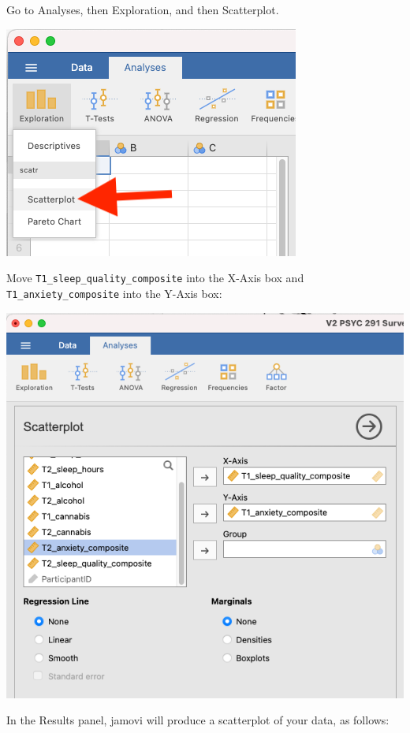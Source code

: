 \documentclass[
]{book}
\begin{document}
Go to {Analyses}, then {Exploration}, and then {Scatterplot}.

\includegraphics{img/scatr2.png}

Move \texttt{T1\_sleep\_quality\_composite} into the X-Axis box and \texttt{T1\_anxiety\_composite} into the Y-Axis box:

\includegraphics{img/scattersetup.png}

In the Results panel, jamovi will produce a scatterplot of your data, as follows:
\end{document}
